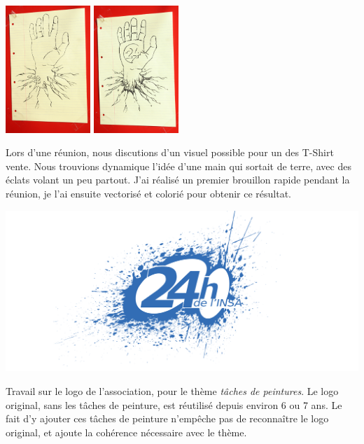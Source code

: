 \begin{center}
                \includegraphics[width=0.24\textwidth]{img/IMG_5792.JPG}
                \includegraphics[width=0.24\textwidth]{img/IMG_5848.JPG}
            \end{center}
            Lors d'une réunion, nous discutions d'un visuel possible pour un des T-Shirt vente. Nous trouvions dynamique l'idée d'une main qui sortait de terre, avec des éclats volant un peu partout.
                J'ai réalisé un premier brouillon rapide pendant la réunion, je l'ai ensuite vectorisé et colorié pour obtenir ce résultat.
            
            \begin{center}                     
                \includegraphics[width=\textwidth]{img/splash24.png}
            \end{center}
                Travail sur le logo de l'association, pour le thème \textit{tâches de peintures}.
                Le logo original, sans les tâches de peinture, est réutilisé depuis environ 6 ou 7 ans.
                Le fait d'y ajouter ces tâches de peinture n'empêche pas de reconnaître le logo original, et ajoute la cohérence nécessaire avec le thème.
                        

